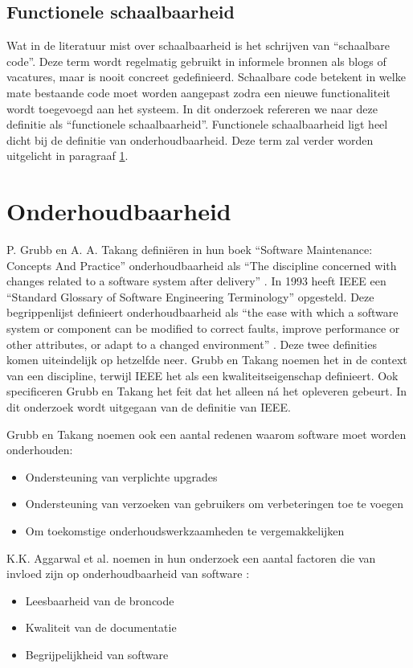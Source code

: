\subsection{Functionele schaalbaarheid}
Wat in de literatuur mist over schaalbaarheid is het schrijven van \enquote{schaalbare code}. Deze term wordt regelmatig gebruikt in informele bronnen als blogs of vacatures, maar is nooit concreet gedefinieerd. Schaalbare code betekent in welke mate bestaande code moet worden aangepast zodra een nieuwe functionaliteit wordt toegevoegd aan het systeem. In dit onderzoek refereren we naar deze definitie als \enquote{functionele schaalbaarheid}. Functionele schaalbaarheid ligt heel dicht bij de definitie van onderhoudbaarheid. Deze term zal verder worden uitgelicht in paragraaf \ref{onderhoudbaarheid}.

\section{Onderhoudbaarheid} \label{onderhoudbaarheid}
P. Grubb en A. A. Takang definiëren in hun boek \enquote{Software Maintenance: Concepts And Practice} onderhoudbaarheid als \enquote{The discipline concerned with changes related to a software system after delivery} \parencite{MaintenanceConcepts}. In 1993 heeft IEEE een \enquote{Standard Glossary of Software Engineering Terminology} opgesteld. Deze begrippenlijst definieert onderhoudbaarheid als \enquote{the ease with which a software system or component can be modified to correct faults, improve performance or other attributes, or adapt to a changed environment} \parencite{SENTerminology}. Deze twee definities komen uiteindelijk op hetzelfde neer. Grubb en Takang noemen het in de context van een discipline, terwijl IEEE het als een kwaliteitseigenschap definieert. Ook specificeren Grubb en Takang het feit dat het alleen ná het opleveren gebeurt. In dit onderzoek wordt uitgegaan van de definitie van IEEE.

Grubb en Takang noemen ook een aantal redenen waarom software moet worden onderhouden:
\begin{itemize}
	\item Ondersteuning van verplichte upgrades
	\item Ondersteuning van verzoeken van gebruikers om verbeteringen toe te voegen
	\item Om toekomstige onderhoudswerkzaamheden te vergemakkelijken
\end{itemize}

K.K. Aggarwal et al. noemen in hun onderzoek een aantal factoren die van invloed zijn op onderhoudbaarheid van software \parencite{MaintainabilityMeasure}:
\begin{itemize}
	\item Leesbaarheid van de broncode
	\item Kwaliteit van de documentatie
	\item Begrijpelijkheid van software
\end{itemize}

